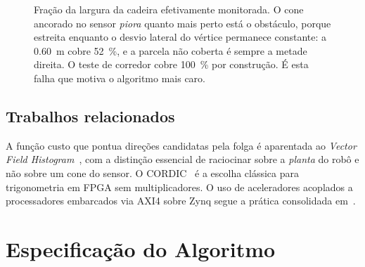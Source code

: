 \documentclass[conference]{IEEEtran}
\begin{document}
\begin{figure}[!t]
\centering
{}
\caption{Fra\c{c}\~ao da largura da cadeira efetivamente monitorada. O cone
ancorado no sensor \emph{piora} quanto mais perto est\'a o obst\'aculo, porque
estreita enquanto o desvio lateral do v\'ertice permanece constante: a
\SI{0.60}{\metre} cobre \SI{52}{\percent}, e a parcela n\~ao coberta \'e sempre a
metade direita. O teste de corredor cobre \SI{100}{\percent} por
constru\c{c}\~ao. \'E esta falha que motiva o algoritmo mais caro.}
\label{fig:cobertura}
\end{figure}

\subsection{Trabalhos relacionados}

A fun\c{c}\~ao custo que pontua dire\c{c}\~oes candidatas pela folga \'e
aparentada ao \emph{Vector Field Histogram}~\cite{borenstein1991}, com a
distin\c{c}\~ao essencial de raciocinar sobre a \emph{planta} do rob\^o e n\~ao
sobre um cone do sensor. O CORDIC~\cite{volder1959,andraka1998} \'e a escolha
cl\'assica para trigonometria em FPGA sem multiplicadores. O uso de aceleradores
acoplados a processadores embarcados via AXI4 sobre Zynq segue a pr\'atica
consolidada em~\cite{zynqbook}.

\section{Especifica\c{c}\~ao do Algoritmo}
\end{document}
